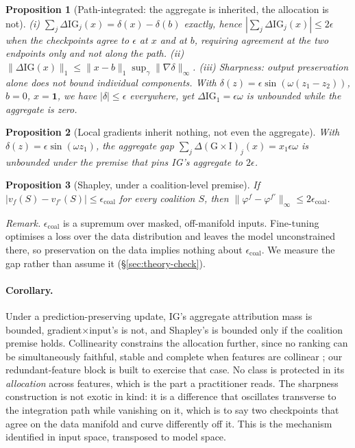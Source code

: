 \documentclass{article}
\newtheorem{proposition}{Proposition}
\begin{document}
\begin{proposition}[Path-integrated: the aggregate is inherited, the allocation is not]
(i) $\sum_j \Delta \mathrm{IG}_j(x)=\delta(x)-\delta(b)$ exactly, hence
$|\sum_j \Delta\mathrm{IG}_j(x)|\le 2\epsilon$ when the checkpoints agree to $\epsilon$ at $x$ and at
$b$, requiring agreement at the two endpoints only and not along the path.
(ii) $\|\Delta\mathrm{IG}(x)\|_1 \le \|x-b\|_1\sup_\gamma\|\nabla\delta\|_\infty$.
(iii) \emph{Sharpness:} output preservation alone does not bound individual components. With
$\delta(z)=\epsilon\sin(\omega(z_1-z_2))$, $b=0$, $x=\mathbf{1}$, we have $|\delta|\le\epsilon$
everywhere, yet $\Delta\mathrm{IG}_1=\epsilon\omega$ is unbounded while the aggregate is zero.
\end{proposition}

\begin{proposition}[Local gradients inherit nothing, not even the aggregate]
With $\delta(z)=\epsilon\sin(\omega z_1)$, the aggregate gap
$\sum_j \Delta(\mathrm{G}{\times}\mathrm{I})_j(x)=x_1\epsilon\omega$ is unbounded under the premise
that pins IG's aggregate to $2\epsilon$.
\end{proposition}

\begin{proposition}[Shapley, under a coalition-level premise]
If $|v_f(S)-v_{f'}(S)|\le\epsilon_{\mathrm{coal}}$ for every coalition $S$, then
$\|\varphi^f-\varphi^{f'}\|_\infty\le 2\epsilon_{\mathrm{coal}}$.
\end{proposition}

\noindent\emph{Remark.} $\epsilon_{\mathrm{coal}}$ is a supremum over masked, off-manifold inputs.
Fine-tuning optimises a loss over the data distribution and leaves the model unconstrained there, so
preservation on the data implies nothing about $\epsilon_{\mathrm{coal}}$. We measure the gap rather
than assume it (\S\ref{sec:theory-check}).

\paragraph{Corollary.} Under a prediction-preserving update, IG's aggregate attribution mass is
bounded, gradient$\times$input's is not, and Shapley's is bounded only if the coalition premise
holds. Collinearity constrains the allocation further, since no ranking can be simultaneously
faithful, stable and complete when features are collinear \citep{attribimposs2026}; our
redundant-feature block is built to exercise that case. No class is protected in its \emph{allocation} across features, which is the part a
practitioner reads. The sharpness construction is not exotic in kind: it is a difference that
oscillates transverse to the integration path while vanishing on it, which is to say two checkpoints
that agree on the data manifold and curve differently off it. This is the mechanism
\citet{dombrowski2019} identified in input space, transposed to model space.
\end{document}
